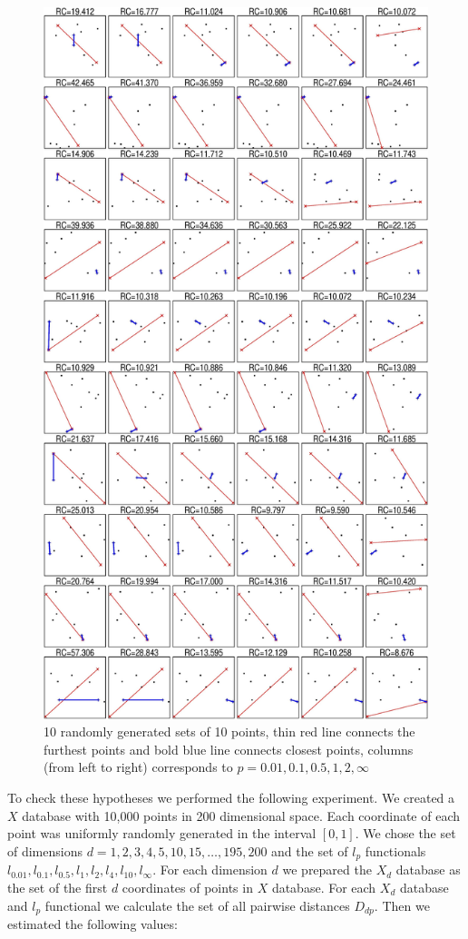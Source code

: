 \documentclass[entropy,article,submit,moreauthors,pdftex]{Definitions/mdpi}
\begin{document}
\begin{figure}[p]
\centerline{\includegraphics[width=0.7\columnwidth ]{ForTab2.png}}\caption{10 randomly generated sets of 10 points, thin red line connects the furthest points and bold blue line connects closest points, columns (from left to right) corresponds to $p=0.01, 0.1, 0.5, 1, 2, \infty $ }
\label{fig:sets}
\end{figure}

To check these hypotheses we performed the following experiment. We created a $X$ database with 10,000 points in 200 dimensional space. Each coordinate of each point was uniformly randomly generated in the interval $[0, 1]$. We chose the set of dimensions $d=1, 2, 3, 4, 5, 10, 15,\ldots, 195, 200$ and the set of $l_p$ functionals $l_{0.01}, l_{0.1}, l_{0.5}, l_{1}, l_{2}, l_{4}, l_{10}, l_{\infty}$. For each dimension $d$ we prepared the $X_d$ database as the set of the first $d$ coordinates of points in $X$ database. For each $X_d$ database and $l_p$ functional we calculate the set of all pairwise distances $D_{dp}$. Then we estimated the following values:
\end{document}
